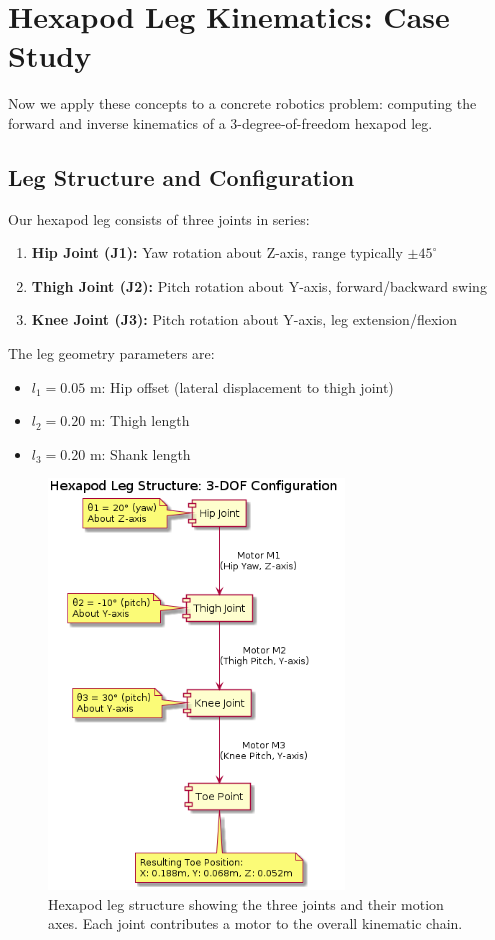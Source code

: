 \documentclass[11pt]{article}
\begin{document}
\section{Hexapod Leg Kinematics: Case Study}

Now we apply these concepts to a concrete robotics problem: computing the forward and inverse kinematics of a 3-degree-of-freedom hexapod leg.

\subsection{Leg Structure and Configuration}

Our hexapod leg consists of three joints in series:
\begin{enumerate}
    \item \textbf{Hip Joint (J1):} Yaw rotation about Z-axis, range typically $\pm 45^\circ$
    \item \textbf{Thigh Joint (J2):} Pitch rotation about Y-axis, forward/backward swing
    \item \textbf{Knee Joint (J3):} Pitch rotation about Y-axis, leg extension/flexion
\end{enumerate}

The leg geometry parameters are:
\begin{itemize}
    \item $l_1 = 0.05$ m: Hip offset (lateral displacement to thigh joint)
    \item $l_2 = 0.20$ m: Thigh length
    \item $l_3 = 0.20$ m: Shank length  
\end{itemize}

\begin{figure}[H]
    \centering
    \includegraphics[width=0.7\textwidth]{illustrations/hexapod_leg_structure.png}
    \caption{Hexapod leg structure showing the three joints and their motion axes. Each joint contributes a motor to the overall kinematic chain.}
    \label{fig:leg_structure}
\end{figure}
\end{document}
